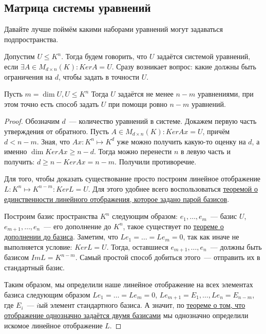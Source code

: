 \subsection{Матрица системы уравнений}
\begin{motivation}
    Давайте лучше поймём какими наборами уравнений могут задаваться подпространства.
\end{motivation}
\begin{definition}
    Допустим $U\leq K^n$. Тогда будем говорить, что $U$ задаётся системой уравнений, если
    $\exists A \in M_{d\times n}(K)\colon Ker A = U$.
    Сразу возникает вопрос: какие должны быть ограничения на $d$, чтобы задать в точности $U$.
\end{definition}
\begin{statement}
    Пусть $m = \dim U, U\leq K^n$ Тогда $U$ задаётся не менее $n - m$ уравнениями, при этом
    точно есть способ задать $U$ при помощи ровно $n - m$ уравнений.
\end{statement}
\begin{proof}
    Обозначим $d$~--- количество уравнений в системе. Докажем первую часть утверждения от обратного. 
    Пусть $A\in M_{d\times n}(K)\colon Ker Ax = U$, причём $d < n - m$.
    Зная, что $Ax\colon K^n\mapsto K^d$ уже можно получить какую-то оценку на $d$, 
    а именно $\dim Ker Ax \geq n - d$. Тогда можно перенести $n$ в левую часть и получить:
    $d \geq n - Ker Ax =  n - m$. Получили противоречие.

    Для того, чтобы доказать существование просто построим линейное отображение $L: K^n\mapsto K^{n-m}\colon
    Ker L = U$. Для этого удобнее всего воспользоваться 
    \hyperref[thm:Линейное отображение однозначно задаётся двумя базисами]{теоремой о единственности линейного
    отображения, которое задано парой базисов}.

    Построим базис пространства $K^n$ следующим образом:  $e_1,\dots,e_m$~--- базис $U$,
    $e_{m + 1},\dots, e_n$~--- его дополнение до $K^n$, такое существует по 
    \hyperref[thm:О дополнении до базиса]{теореме о дополнении до базиса}.
    Заметим, что $Le_1 = \dots = Le_m = 0$, так как иначе не выполняется условие: $Ker L = U$. 
    Тогда, оставшиеся $e_{m + 1},\dots, e_n$~--- должны быть базисом $Im L = K^{n - m}$.
    Самый простой способ добиться этого~--- отправить их в стандартный базис.
    
    Таким образом, мы определили наше линейное отображение на всех элементах базиса
    следующим образом $Le_1 = \dots = Le_m = 0$, $Le_{m + 1} = E_1, \dots, Le_n = E_{n - m}$,
    где $E_i$~--- $i$ый элемент стандартного базиса. А значит, по 
    \hyperref[thm:Линейное отображение однозначно задаётся двумя базисами]
    {теореме о том, что отображение однозначно задаётся двумя базисами}
    мы однозначно определили искомое линейное отображение $L$.
\end{proof}
